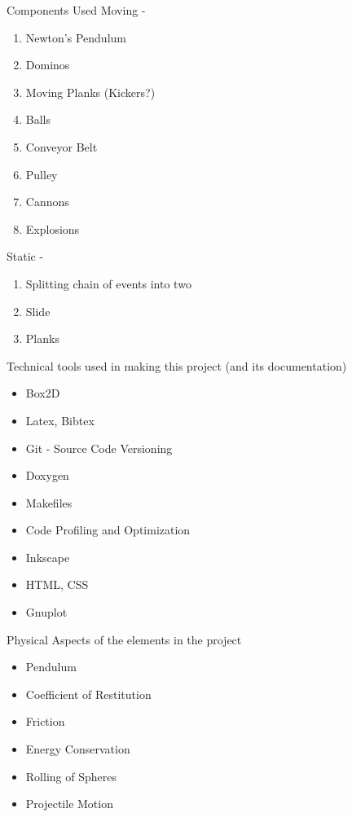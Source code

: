 \documentclass[a4paper,12pt]{article}
\begin{document}
\begin{section}{Components Used}
Moving - \\
\begin{enumerate}
\item Newton's Pendulum
\item Dominos
\item Moving Planks (Kickers?)
\item Balls
\item Conveyor Belt
\item Pulley
\item Cannons
\item Explosions
\end{enumerate}
Static - \\
\begin{enumerate}
\item Splitting chain of events into two
\item Slide
\item Planks
\end{enumerate}
\end{section}
\bigskip

\begin{section}{Technical tools used in making this project (and its documentation)}
\begin{itemize}
\item Box2D
\item Latex, Bibtex
\item Git - Source Code Versioning
\item Doxygen
\item Makefiles
\item Code Profiling and Optimization
\item Inkscape
\item HTML, CSS
\item Gnuplot
\end{itemize}
\end{section}
\bigskip

\begin{section}{Physical Aspects of the elements in the project}
\begin{itemize}
\item Pendulum
\item Coefficient of Restitution
\item Friction
\item Energy Conservation
\item Rolling of Spheres
\item Projectile Motion
\end{itemize}
\end{section}
\bigskip
\end{document}
